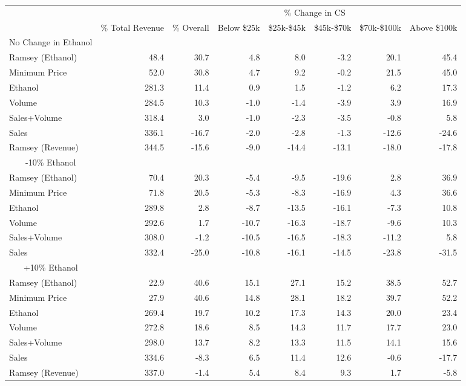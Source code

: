 \begin{tabular}{l r |r  rrrrr} 
\toprule 
\multicolumn{2}{c|}{}& \multicolumn{6}{c}{\% Change in CS} \\ 
& \% Total Revenue &  \% Overall &  Below \$25k & \$25k-\$45k &  \$45k-\$70k & \$70k-\$100k & Above \$100k \\ 
\multicolumn{1}{c}{No Change in Ethanol}&&&&&&& \\ 
\cmidrule(lr){1-1} \cmidrule(lrrrr){2-8} 

Ramsey (Ethanol) & 48.4 & 30.7 & 4.8 & 8.0 & -3.2 & 20.1 & 45.4 \\
Minimum Price & 52.0 & 30.8 & 4.7 & 9.2 & -0.2 & 21.5 & 45.0 \\
Ethanol & 281.3 & 11.4 & 0.9 & 1.5 & -1.2 & 6.2 & 17.3 \\
Volume & 284.5 & 10.3 & -1.0 & -1.4 & -3.9 & 3.9 & 16.9 \\
Sales+Volume & 318.4 & 3.0 & -1.0 & -2.3 & -3.5 & -0.8 & 5.8 \\
Sales & 336.1 & -16.7 & -2.0 & -2.8 & -1.3 & -12.6 & -24.6 \\
Ramsey (Revenue) & 344.5 & -15.6 & -9.0 & -14.4 & -13.1 & -18.0 & -17.8 \\
\midrule 
\multicolumn{1}{c}{-10\% Ethanol}&&&&&&& \\ 
\cmidrule(lr){1-1} \cmidrule(lrrrr){2-8} 

Ramsey (Ethanol) & 70.4 & 20.3 & -5.4 & -9.5 & -19.6 & 2.8 & 36.9 \\
Minimum Price & 71.8 & 20.5 & -5.3 & -8.3 & -16.9 & 4.3 & 36.6 \\
Ethanol & 289.8 & 2.8 & -8.7 & -13.5 & -16.1 & -7.3 & 10.8 \\
Volume & 292.6 & 1.7 & -10.7 & -16.3 & -18.7 & -9.6 & 10.3 \\
Sales+Volume & 308.0 & -1.2 & -10.5 & -16.5 & -18.3 & -11.2 & 5.8 \\
Sales & 332.4 & -25.0 & -10.8 & -16.1 & -14.5 & -23.8 & -31.5 \\
\midrule 
\multicolumn{1}{c}{+10\% Ethanol}&&&&&&& \\ 
\cmidrule(lr){1-1} \cmidrule(lrrrr){2-8} 

Ramsey (Ethanol) & 22.9 & 40.6 & 15.1 & 27.1 & 15.2 & 38.5 & 52.7 \\
Minimum Price & 27.9 & 40.6 & 14.8 & 28.1 & 18.2 & 39.7 & 52.2 \\
Ethanol & 269.4 & 19.7 & 10.2 & 17.3 & 14.3 & 20.0 & 23.4 \\
Volume & 272.8 & 18.6 & 8.5 & 14.3 & 11.7 & 17.7 & 23.0 \\
Sales+Volume & 298.0 & 13.7 & 8.2 & 13.3 & 11.5 & 14.1 & 15.6 \\
Sales & 334.6 & -8.3 & 6.5 & 11.4 & 12.6 & -0.6 & -17.7 \\
Ramsey (Revenue) & 337.0 & -1.4 & 5.4 & 8.4 & 9.3 & 1.7 & -5.8 \\
\bottomrule 
\end{tabular}